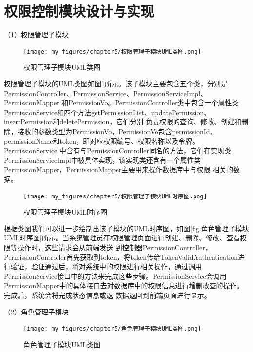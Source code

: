\section{权限控制模块设计与实现}

（1）权限管理子模块

\begin{figure}[htb]
    \centering
    \texttt{[image: my\_figures/chapter5/权限管理子模块UML类图.png]}
    \caption{权限管理子模块UML类图}
    \label{fig:权限管理子模块UML类图}
\end{figure}

权限管理子模块的UML类图如图\ref{fig:权限管理子模块UML类图}所示。该子模块主要包含五个类，分别是PermissionController、PermissionService、PermissionServiceImpl、PermissionMapper
和PermissionVo。PermissionController类中包含一个属性类PermissionService和四个方法getPermissionList、updatePermission、insertPermission和deletePermission，它们分别
负责权限的查询、修改、创建和删除，接收的参数类型为PermissionVo，PermissionVo包含permissionId、permissionName和token，即对应权限编号、权限名称以及令牌。PermissionService
中含有与PermissionController同名的方法，它们在实现类PermissionServiceImpl中被具体实现，该实现类还含有一个属性类PermissionMapper，PermissionMapper主要用来操作数据库中与权限
相关的数据。

\begin{figure}[htb]
    \centering
    \texttt{[image: my\_figures/chapter5/权限管理子模块UML时序图.png]}
    \caption{权限管理子模块UML时序图}
    \label{fig:权限管理子模块UML时序图}
\end{figure}

根据类图我们可以进一步绘制出该子模块的UML时序图，如图\ref{fig:角色管理子模块UML时序图}所示。当系统管理员在权限管理页面进行创建、删除、修改、查看权限等操作时，这些请求会从前端发送
到控制器PermissionController，PermissionController首先获取到token，将token传给TokenValidAuthentication进行验证，验证通过后，将对系统中的权限进行相关操作，通过调用
PermissionService接口中的方法来完成这些步骤。PermissionService会调用PermissionMapper中的具体接口去对数据库中的权限信息进行增删改查的操作。完成后，系统会将完成状态信息或返
数据返回到前端页面进行显示。

（2）角色管理子模块

\begin{figure}[htb]
    \centering
    \texttt{[image: my\_figures/chapter5/角色管理子模块UML类图.png]}
    \caption{角色管理子模块UML类图}
    \label{fig:角色管理子模块UML类图}
\end{figure}

